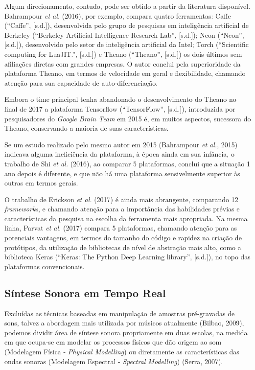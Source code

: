 \documentclass[]{article}
\begin{document}
Algum direcionamento, contudo, pode ser obtido a partir da literatura
disponível. Bahrampour \emph{et al.} (2016), por exemplo, compara quatro
ferramentas: Caffe (``Caffe'', {[}s.d.{]}), desenvolvida pelo grupo de
pesquisas em inteligência artificial de Berkeley (``Berkeley Artificial
Intelligence Research Lab'', {[}s.d.{]}); Neon (``Neon'', {[}s.d.{]}),
desenvolvido pelo setor de inteligência artificial da Intel; Torch
(``Scientific computing for LuaJIT.'', {[}s.d.{]}) e Theano (``Theano'',
{[}s.d.{]}) os dois últimos sem afiliações diretas com grandes empresas.
O autor conclui pela superioridade da plataforma Theano, em termos de
velocidade em geral e flexibilidade, chamando atenção para sua
capacidade de auto-diferenciação.

Embora o time principal tenha abandonado o desenvolvimento do Theano no
final de 2017 a plataforma Tensorflow (``TensorFlow'', {[}s.d.{]}),
introduzida por pesquisadores do \emph{Google Brain Team} em 2015 é, em
muitos aspectos, sucessora do Theano, conservando a maioria de suas
características.

Se um estudo realizado pelo mesmo autor em 2015 (Bahrampour \emph{et
al.}, 2015) indicava alguma ineficiência da plataforma, à época ainda em
sua infância, o trabalho de Shi \emph{et al.} (2016), ao comparar 5
plataformas, conclui que a situação 1 ano depois é diferente, e que não
há uma plataforma sensivelmente superior às outras em termos gerais.

O trabalho de Erickson \emph{et al.} (2017) é ainda mais abrangente,
comparando 12 \emph{frameworks}, e chamando atenção para a importância
das habilidades prévias e características da pesquisa na escolha da
ferramenta mais apropriada. Na mesma linha, Parvat \emph{et al.} (2017)
compara 5 plataformas, chamando atenção para as potenciais vantagens, em
termos do tamanho do código e rapidez na criação de protótipos, da
utilização de bibliotecas de nível de abstração mais alto, como a
biblioteca Keras (``Keras: The Python Deep Learning library'',
{[}s.d.{]}), no topo das plataformas convencionais.

\hypertarget{suxedntese-sonora-em-tempo-real}{%
\subsection{Síntese Sonora em Tempo
Real}\label{suxedntese-sonora-em-tempo-real}}

Excluídas as técnicas baseadas em manipulação de amostras pré-gravadas
de sons, talvez a abordagem mais utilizada por músicos atualmente
(Bilbao, 2009), podemos dividir área de síntese sonora propriamente em
duas escolas, na medida em que ocupa-se em modelar os processos físicos
que dão origem ao som (Modelagem Física - \emph{Physical Modelling}) ou
diretamente as características das ondas sonoras (Modelagem Espectral -
\emph{Spectral Modelling}) (Serra, 2007).
\end{document}
